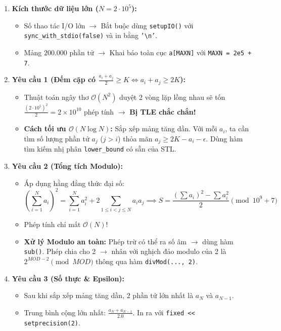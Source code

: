 \documentclass[11pt,a4paper]{article}
\begin{document}
\begin{enumerate}[leftmargin=*]
    \item \textbf{Kích thước dữ liệu lớn ($N = 2 \cdot 10^5$):}
    \begin{itemize}
        \item Số thao tác I/O lớn $\to$ Bắt buộc dùng \texttt{setupIO()} với \texttt{sync\_with\_stdio(false)} và in bằng \texttt{'\textbackslash n'}.
        \item Mảng $200.000$ phần tử $\to$ Khai báo toàn cục \texttt{a[MAXN]} với \texttt{MAXN = 2e5 + 7}.
    \end{itemize}
    \item \textbf{Yêu cầu 1 (Đếm cặp có $\frac{a_i + a_j}{2} \ge K \iff a_i + a_j \ge 2K$):}
    \begin{itemize}
        \item Thuật toán ngây thơ $\mathcal{O}(N^2)$ duyệt 2 vòng lặp lồng nhau sẽ tốn $\frac{(2\cdot 10^5)^2}{2} = 2 \times 10^{10}$ phép tính $\to$ \textbf{Bị TLE chắc chắn!}
        \item \textbf{Cách tối ưu $\mathcal{O}(N \log N)$:} Sắp xếp mảng tăng dần. Với mỗi $a_i$, ta cần tìm số lượng phần tử $a_j$ ($j > i$) thỏa mãn $a_j \ge 2K - a_i - \epsilon$. Dùng hàm tìm kiếm nhị phân \texttt{lower\_bound} có sẵn của STL.
    \end{itemize}
    \item \textbf{Yêu cầu 2 (Tổng tích Modulo):}
    \begin{itemize}
        \item Áp dụng hằng đẳng thức đại số:
        $$\left(\sum_{i=1}^N a_i\right)^2 = \sum_{i=1}^N a_i^2 + 2 \sum_{1 \le i < j \le N} a_i a_j \implies S = \frac{\left(\sum a_i\right)^2 - \sum a_i^2}{2} \pmod{10^9 + 7}$$
        \item Phép tính chỉ mất $\mathcal{O}(N)$!
        \item \textbf{Xử lý Modulo an toàn:} Phép trừ có thể ra số âm $\to$ dùng hàm \texttt{sub()}. Phép chia cho 2 $\to$ nhân với nghịch đảo modulo của 2 là $2^{MOD - 2} \pmod{MOD}$ thông qua hàm \texttt{divMod(..., 2)}.
    \end{itemize}
    \item \textbf{Yêu cầu 3 (Số thực \& Epsilon):}
    \begin{itemize}
        \item Sau khi sắp xếp mảng tăng dần, 2 phần tử lớn nhất là $a_N$ và $a_{N-1}$.
        \item Trung bình cộng lớn nhất: $\frac{a_N + a_{N-1}}{2.0}$. In ra với \texttt{fixed << setprecision(2)}.
    \end{itemize}
\end{enumerate}
\end{document}
